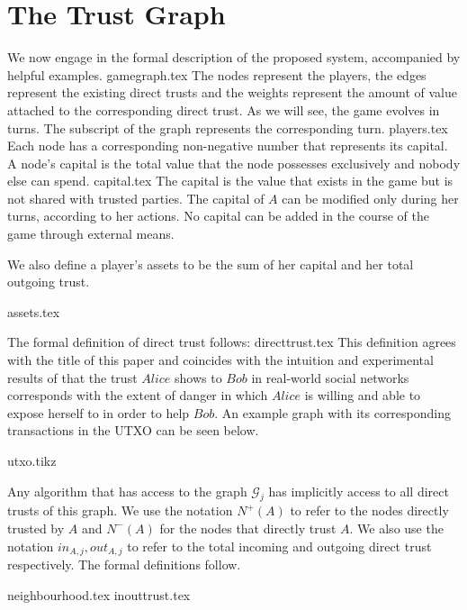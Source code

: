 \section{The Trust Graph}
  We now engage in the formal description of the proposed system, accompanied by helpful examples.
  {gamegraph.tex}
  The nodes represent the players, the edges represent the existing direct trusts and the weights represent the amount of
  value attached to the corresponding direct trust. As we will see, the game evolves in turns. The subscript of the graph
  represents the corresponding turn.
  {players.tex}
  Each node has a corresponding non-negative number that represents its capital. A node's capital is the total value that
  the node possesses exclusively and nobody else can spend.
  {capital.tex}
  The capital is the value that exists in the game but is not shared with trusted parties. The capital of $A$ can be
  modified only during her turns, according to her actions. No capital can be added in the course of the game through
  external means.

  We also define a player's assets to be the sum of her capital and her total outgoing trust.

  {assets.tex}

  The formal definition of direct trust follows:
  {directtrust.tex}
  This definition agrees with the title of this paper and coincides with the intuition and experimental results of
  \cite{kmrs} that the trust $Alice$ shows to $Bob$ in real-world social networks corresponds with the extent
  of danger in which $Alice$ is willing and able to expose herself to in order to help $Bob$. An example graph with its
  corresponding transactions in the UTXO can be seen below.

  {utxo.tikz}

  Any algorithm that has access to the graph $\mathcal{G}_j$ has implicitly access to all direct trusts of this graph.
  We use the notation $N^{+}(A)$ to refer to the nodes directly trusted by $A$ and $N^{-}(A)$ for the nodes that directly
  trust $A$. We also use the notation $in_{A, j}, out_{A, j}$ to refer to the total incoming and outgoing direct trust
  respectively. The formal definitions follow. %

  {neighbourhood.tex}
  {inouttrust.tex}
